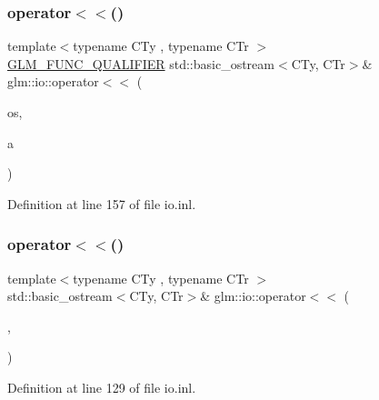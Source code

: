 \subsubsection{\texorpdfstring{operator$<$$<$()}{operator<<()}\hspace{0.1cm}{\footnotesize\ttfamily [3/7]}}
{\footnotesize\ttfamily template$<$typename C\+Ty , typename C\+Tr $>$ \\
\hyperlink{setup_8hpp_a33fdea6f91c5f834105f7415e2a64407}{G\+L\+M\+\_\+\+F\+U\+N\+C\+\_\+\+Q\+U\+A\+L\+I\+F\+I\+ER} std\+::basic\+\_\+ostream$<$C\+Ty, C\+Tr$>$\& glm\+::io\+::operator$<$$<$ (\begin{DoxyParamCaption}\item[{std\+::basic\+\_\+ostream$<$ C\+Ty, C\+Tr $>$ \&}]{os,  }\item[{\hyperlink{structglm_1_1io_1_1order}{order} const \&}]{a }\end{DoxyParamCaption})}



Definition at line 157 of file io.\+inl.

\mbox{\label{namespaceglm_1_1io_aa5761ee427320d2121a97a7450256e3b}} 
\subsubsection{\texorpdfstring{operator$<$$<$()}{operator<<()}\hspace{0.1cm}{\footnotesize\ttfamily [4/7]}}
{\footnotesize\ttfamily template$<$typename C\+Ty , typename C\+Tr $>$ \\
std\+::basic\+\_\+ostream$<$C\+Ty, C\+Tr$>$\& glm\+::io\+::operator$<$$<$ (\begin{DoxyParamCaption}\item[{std\+::basic\+\_\+ostream$<$ C\+Ty, C\+Tr $>$ \&}]{,  }\item[{\hyperlink{structglm_1_1io_1_1precision}{precision} const \&}]{ }\end{DoxyParamCaption})}



Definition at line 129 of file io.\+inl.

\mbox{\label{namespaceglm_1_1io_a721b0bde3ed5f7d7b11a1d90d22a8ad3}} 
